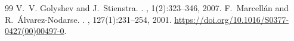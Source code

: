 \documentclass[10pt,a4paper]{amsart}
\begin{document}
\begin{thebibliography}{99}
 V.~V. Golyshev and J.~Stienstra. . , 1(2):323--346, 2007.
 F.~Marcell\'an and R.~\'Alvarez-Nodarse. . , 127(1):231--254, 2001. \newblock \url{https://doi.org/10.1016/S0377-0427(00)00497-0}.
\end{thebibliography}
\end{document}
